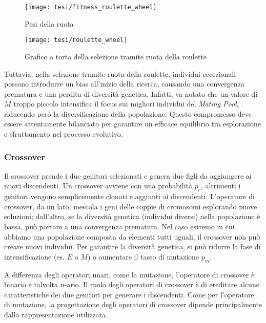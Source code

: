 \begin{figure}[!ht] 
    \centering 
    \texttt{[image: tesi/fitness\_roulette\_wheel]} 
    \caption{Pesi della ruota}
\end{figure}

\begin{figure}[!ht] 
    \centering 
    \texttt{[image: tesi/roulette\_wheel]} 
    \caption{Grafico a torta della selezione tramite ruota della roulette}
\end{figure}

Tuttavia, nella selezione tramite ruota della roulette, individui eccezionali possono introdurre un bias all'inizio della ricerca, causando una convergenza prematura e una perdita di diversità genetica. Infatti, va notato che un valore di \( M \) troppo piccolo intensifica il focus sui migliori individui del \emph{Mating Pool}, riducendo però la diversificazione della popolazione. Questo compromesso deve essere attentamente bilanciato per garantire un efficace equilibrio tra esplorazione e sfruttamento nel processo evolutivo.

\subsubsection{Crossover}
Il crossover prende i due genitori selezionati e genera due figli da aggiungere ai nuovi discendenti. Un crossover avviene con una probabilità $p_c$, altrimenti i genitori vengono semplicemente clonati e aggiunti ai discendenti. L'operatore di crossover, da un lato, mescola i geni delle coppie di cromosomi esplorando nuove soluzioni; dall'altro, se la diversità genetica (individui diversi) nella popolazione è bassa, può portare a una convergenza prematura. Nel caso estremo in cui abbiamo una popolazione composta da elementi tutti uguali, il crossover non può creare nuovi individui. Per garantire la diversità genetica, si può ridurre la fase di intensificazione (es. $E$ o $M$) o aumentare il tasso di mutazione $p_m$.

A differenza degli operatori unari, come la mutazione, l'operatore di crossover è binario e talvolta n-ario. Il ruolo degli operatori di crossover è di ereditare alcune caratteristiche dei due genitori per generare i discendenti. Come per l'operatore di mutazione, la progettazione degli operatori di crossover dipende principalmente dalla rappresentazione utilizzata.

